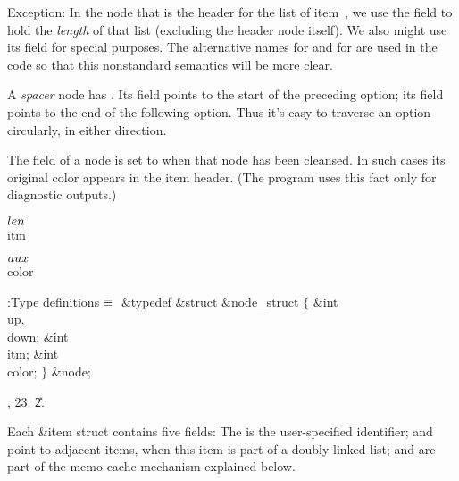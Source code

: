 Exception: In the node  that is the header for the list of
item~, we use the  field to hold the {\it length\/} of that
list (excluding the header node itself).
We also might use its  field for special purposes.
The alternative names  for  and  for 
are used in the code so that this nonstandard semantics will be more clear.

A {\it spacer\/} node has . Its  field points
to the start
of the preceding option; its  field points to the end of the
following option.
Thus it's easy to traverse an option circularly, in either direction.

The  field of a node is set to  when that node has
been cleansed.
In such cases its original color appears in the item header.
(The program uses this fact only for diagnostic outputs.)

\Y\B\4\D$\\{len}$ \5
\\{itm}\par
\B\4\D$\\{aux}$ \5
\\{color}\par
\Y\B\4:Type definitions\X${}\equiv{}$\6
\&{typedef} \&{struct} \&{node\_struct} ${}\{{}$\1\6
\&{int} \\{up}${},{}$ \\{down};\6
\&{int} \\{itm};\6
\&{int} \\{color};\2\6
${}\}{}$ \&{node};\par
{}, 23.
\U2.\fi

Each \&{item} struct contains five fields:
The  is the user-specified identifier;
 and  point to adjacent items, when this
item is part of a doubly linked list;
 and  are part of the memo-cache mechanism explained
below.

